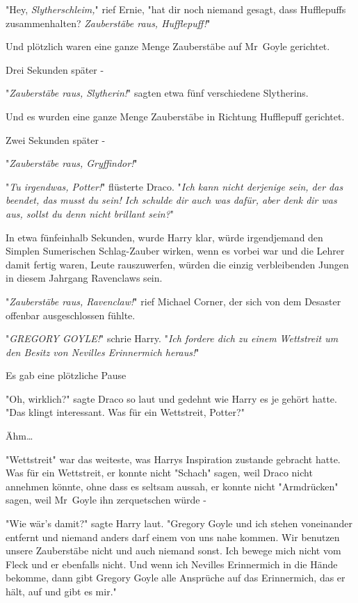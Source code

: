 {"Hey, \emph{Slytherschleim,}" rief Ernie, "hat dir noch niemand gesagt, dass Hufflepuffs zusammenhalten? \emph{Zauberstäbe raus, Hufflepuff!}"

Und plötzlich waren eine ganze Menge Zauberstäbe auf Mr~Goyle gerichtet.

Drei Sekunden später -

"\emph{Zauberstäbe raus, Slytherin!}" sagten etwa fünf verschiedene Slytherins.

Und es wurden eine ganze Menge Zauberstäbe in Richtung Hufflepuff gerichtet.

Zwei Sekunden später -

"\emph{Zauberstäbe raus, Gryffindor!}"

"\emph{Tu irgendwas, Potter!}" flüsterte Draco. "\emph{Ich kann nicht derjenige sein, der das beendet, das musst du sein! Ich schulde dir auch was dafür, aber denk dir was aus, sollst du denn nicht brillant sein?}"

In etwa fünfeinhalb Sekunden, wurde Harry klar, würde irgendjemand den Simplen Sumerischen Schlag-Zauber wirken, wenn es vorbei war und die Lehrer damit fertig waren, Leute rauszuwerfen, würden die einzig verbleibenden Jungen in diesem Jahrgang Ravenclaws sein.

"\emph{Zauberstäbe raus, Ravenclaw!}" rief Michael Corner, der sich von dem Desaster offenbar ausgeschlossen fühlte.

"\emph{GREGORY GOYLE!}" schrie Harry. "\emph{Ich fordere dich zu einem Wettstreit um den Besitz von Nevilles Erinnermich heraus!}"

Es gab eine plötzliche Pause

"Oh, wirklich?" sagte Draco so laut und gedehnt wie Harry es je gehört hatte. "Das klingt interessant. Was für ein Wettstreit, Potter?"

Ähm…

"Wettstreit" war das weiteste, was Harrys Inspiration zustande gebracht hatte. Was für ein Wettstreit, er konnte nicht "Schach" sagen, weil Draco nicht annehmen könnte, ohne dass es seltsam aussah, er konnte nicht "Armdrücken" sagen, weil Mr~Goyle ihn zerquetschen würde -

"Wie wär's damit?" sagte Harry laut. "Gregory Goyle und ich stehen voneinander entfernt und niemand anders darf einem von uns nahe kommen. Wir benutzen unsere Zauberstäbe nicht und auch niemand sonst. Ich bewege mich nicht vom Fleck und er ebenfalls nicht. Und wenn ich Nevilles Erinnermich in die Hände bekomme, dann gibt Gregory Goyle alle Ansprüche auf das Erinnermich, das er hält, auf und gibt es mir."

}
